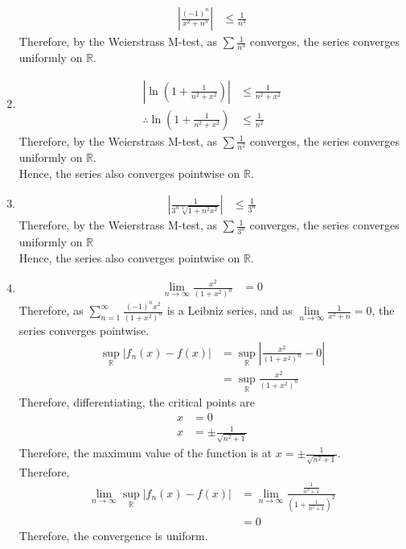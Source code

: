 \documentclass[fleqn, a4paper, 11pt, oneside]{amsart}
\theoremstyle{definition}
\theoremstyle{theorem}
\begin{document}
\begin{solution}
\begin{enumerate}[leftmargin = *]
			\begin{align*}
				\left| \frac{(-1)^n}{x^2 + n^3} \right| & \le \frac{1}{n^3}
			\end{align*}
			Therefore, by the Weierstrass M-test, as $\sum \frac{1}{n^3}$ converges, the series converges uniformly on $\mathbb{R}$.
		\item
			\begin{align*}
				\left| \ln \left( 1 + \frac{1}{n^2 + x^2} \right) \right| & \le \frac{1}{n^2 + x^2} \\
				\therefore \ln \left( 1 + \frac{1}{n^2 + x^2} \right)     & \le \frac{1}{n^2}
			\end{align*}
			Therefore, by the Weierstrass M-test, as $\sum \frac{1}{n^2}$ converges, the series converges uniformly on $\mathbb{R}$.\\
			Hence, the series also converges pointwise on $\mathbb{R}$.
		\item
			\begin{align*}
				\left| \frac{1}{3^n \sqrt[3]{1 + n^2 x^2}} \right| & \le \frac{1}{3^n}
			\end{align*}
			Therefore, by the Weierstrass M-test, as $\sum \frac{1}{3^n}$ converges, the series converges uniformly on $\mathbb{R}$\\
			Hence, the series also converges pointwise on $\mathbb{R}$.
		\item
			\begin{align*}
				\lim\limits_{n \to \infty} \frac{x^2}{(1 + x^2)^n} & = 0
			\end{align*}
			Therefore, as $\sum\limits_{n = 1}^{\infty} \frac{(-1)^n x^2}{(1 + x^2)^n}$ is a Leibniz series, and as $\lim\limits_{n \to \infty} \frac{1}{x^2 + n} = 0$, the series converges pointwise.
			\begin{align*}
				\sup\limits_{\mathbb{R}} \left| f_n(x) - f(x) \right| & = \sup\limits_{\mathbb{R}} \left| \frac{x^2}{(1 + x^2)^n} - 0 \right| \\
                                                                                      & = \sup\limits_{\mathbb{R}} \frac{x^2}{(1 + x^2)^n}
			\end{align*}
			Therefore, differentiating, the critical points are
			\begin{align*}
				x & = 0 \\
				x & = \pm \frac{1}{\sqrt{n^2 + 1}}
			\end{align*}
			Therefore, the maximum value of the function is at $x = \pm \frac{1}{\sqrt{n^2 + 1}}$.\\
			Therefore,
			\begin{align*}
				\lim\limits_{n \to \infty} \sup\limits_{\mathbb{R}} |f_n(x) - f(x)| & = \lim\limits_{n \to \infty} \frac{\frac{1}{n^2 + 1}}{\left( 1 + \frac{1}{n^2 + 1} \right)^2} \\
                                                                                                    & = 0
			\end{align*}
			Therefore, the convergence is uniform.
	\end{enumerate}
\end{solution}
\end{document}
